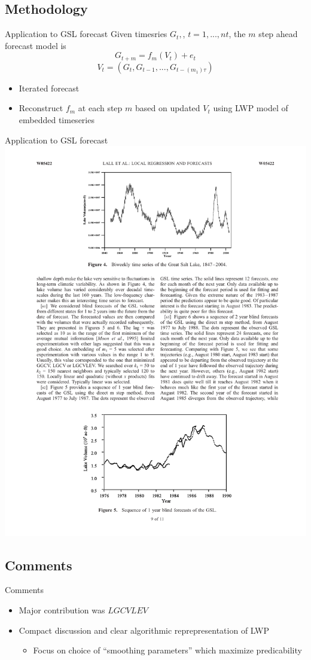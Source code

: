 \documentclass[xcolor=x11names,compress]{beamer}
\renewcommand{\(}{\begin{columns}}
\renewcommand{\)}{\end{columns}}
\newcommand{\<}[1]{\begin{column}{#1}}
\renewcommand{\>}{\end{column}}
\begin{document}
\subsection{Methodology}
\begin{frame}{Application to GSL forecast}
Given timesries $G_t,$, $t=1,...,nt$, the $m$ step ahead forecast model is
$$G_{t+m}=f_m({V_t})+e_t$$
$$V_t=(G_t, G_{t-1}, ..., G_{t-(m_1)\tau})$$
\begin{itemize}
	\item Iterated forecast
	\item Reconstruct $f_m$ at each step $m$ based on updated $V_t$ using LWP model of embedded timeseries
\end{itemize}
\end{frame}

\begin{frame}{Application to GSL forecast}
\includegraphics[width=.8\textwidth]{fc.pdf}
\end{frame}

\subsection{Comments}
\begin{frame}{Comments}

\begin{itemize}
\item Major contribution was $LGCVLEV$
\item Compact discussion and clear algorithmic reprepresentation of LWP
	\begin{itemize}
		\item Focus on choice of ``smoothing parameters'' which maximize predicability
	\end{itemize}
\end{itemize}

\end{frame}
\end{document}
